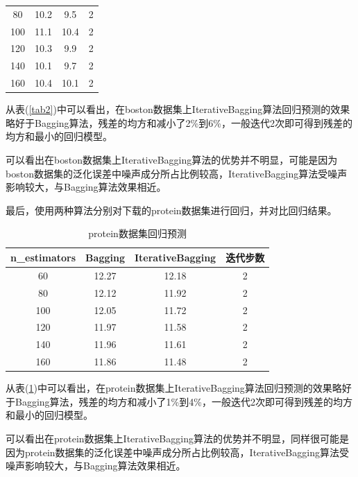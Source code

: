 \documentclass[a4paper,oneside,12pt]{article}
\begin{document}
\begin{spacing}{1.5}
\begin{table}[htbp]
\begin{tabular}{cccc}
80 &10.2 &9.5 &2\\

100 &11.1 &10.4 &2\\

120 &10.3 &9.9 &2\\

140 &10.1 &9.7 &2\\

160 &10.4 &10.1 &2\\
\bottomrule
\end{tabular}
\end{table}
从表(\ref{tab2})中可以看出，在boston数据集上IterativeBagging算法回归预测的效果略好于Bagging算法，残差的均方和减小了2\%到6\%，一般迭代2次即可得到残差的均方和最小的回归模型。\par
可以看出在boston数据集上IterativeBagging算法的优势并不明显，可能是因为boston数据集的泛化误差中噪声成分所占比例较高，IterativeBagging算法受噪声影响较大，与Bagging算法效果相近。\par
\par
最后，使用两种算法分别对下载的protein数据集进行回归，并对比回归结果。
\begin{table}[htbp]
\caption{\label{tab4}protein数据集回归预测}
\center
\begin{tabular}{cccc}
\toprule
n\_estimators &Bagging &IterativeBagging &迭代步数\\
\midrule
60 &12.27 &12.18 &2\\

80 &12.12 &11.92 &2\\

100 &12.05 &11.72 &2\\

120 &11.97 &11.58 &2\\

140 &11.96 &11.61 &2\\

160 &11.86 &11.48 &2\\
\bottomrule
\end{tabular}
\end{table}
从表(\ref{tab4})中可以看出，在protein数据集上IterativeBagging算法回归预测的效果略好于Bagging算法，残差的均方和减小了1\%到4\%，一般迭代2次即可得到残差的均方和最小的回归模型。\par
可以看出在protein数据集上IterativeBagging算法的优势并不明显，同样很可能是因为protein数据集的泛化误差中噪声成分所占比例较高，IterativeBagging算法受噪声影响较大，与Bagging算法效果相近。\par
\par

\end{spacing}
\end{document}
